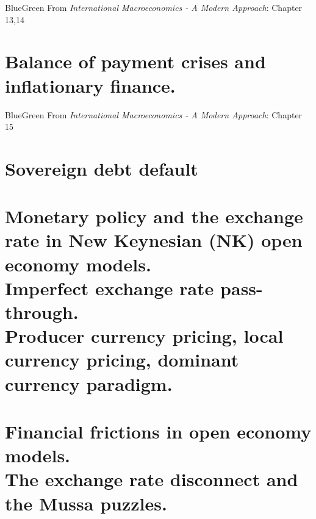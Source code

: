 \documentclass[usenames,dvipsnames,12pt]{book}
\begin{document}
        \begin{mybox}{BlueGreen}{}
            From \textit{International Macroeconomics - A Modern Approach}: Chapter 13,14
        \end{mybox}

    \chapter[Balance of payment crises]{Balance of payment crises and inflationary finance.}

        \begin{mybox}{BlueGreen}{}
            From \textit{International Macroeconomics - A Modern Approach}: Chapter 15
        \end{mybox}

    \chapter{Sovereign debt default}

    \chapter[Monetary policy in NK models]{Monetary policy and the exchange rate in New Keynesian (NK) open economy models. \\ Imperfect exchange rate pass-through. \\ Producer currency pricing, local currency pricing, dominant currency paradigm.}

    \chapter[Financial frictions in open economy models]{Financial frictions in open economy models. \\ The exchange rate disconnect and the Mussa puzzles.}
\end{document}
